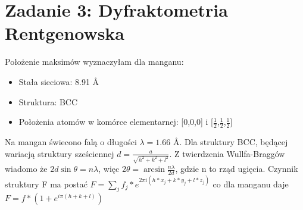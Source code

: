 \documentclass[a4paper,10pt]{article}
\begin{document}
\section{Zadanie 3: Dyfraktometria Rentgenowska}
Położenie maksimów wyznaczyłam dla manganu: 
\begin{itemize}
	\item Stała sieciowa: 8.91 \AA
\item Struktura: BCC
\item Położenia atomów w komórce elementarnej: [0,0,0] i [$\frac{1}{2}$,$\frac{1}{2}$,$\frac{1}{2}$]
\end{itemize}
Na mangan świecono falą o długości $\lambda = 1.66$ \AA. 
Dla struktury BCC, będącej wariacją struktury sześciennej $d=\frac{a}{\sqrt{h^2 +k^2 + l^2}}$. Z twierdzenia Wullfa-Braggów wiadomo że $2 d \sin{\theta} =n\lambda$, więc $2 \theta = \arcsin{\frac{n\lambda} {2 d}} $, gdzie n to rząd ugięcia. Czynnik struktury F ma postać $F=\sum\limits_j f_j * e^{2 \pi i(h*x_j+k*y_j+l*z_j)} $ co dla manganu daje $F=f *( 1+e^{i\pi (h+k+l)}) $ \\
\end{document}
